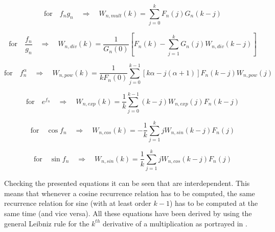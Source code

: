 \begin{equation} \label{eq:recRel2}
\text{for} \quad f_{n}g_{n} \quad \Rightarrow \quad W_{n,mult}\left(k\right)=\displaystyle\sum_{j=0}^{k}F_{n}\left(j\right)G_{n}\left(k-j\right)
\end{equation}

\begin{equation} \label{eq:recRel3}
\text{for} \quad \dfrac{f_{n}}{g_{n}} \quad \Rightarrow \quad W_{n,div}\left(k\right)= \dfrac{1}{G_{n}\left(0\right)}\left[F_{n}\left(k\right)-\displaystyle\sum_{j=1}^{k}G_{n}\left(j\right)W_{n,div}\left(k-j\right) \right]
\end{equation}

\begin{equation} \label{eq:recRel4}
\text{for} \quad f_{n}^{\alpha} \quad \Rightarrow \quad W_{n,pow}\left(k\right)= \dfrac{1}{kF_{n}\left(0\right)} \displaystyle\sum_{j=0}^{k-1}\left[k\alpha-j\left(\alpha+1\right)\right] F_{n}\left(k-j\right)W_{n,pow}\left(j\right) 
\end{equation}

\begin{equation} \label{eq:recRel5}
\text{for} \quad e^{f_{n}} \quad \Rightarrow \quad W_{n,exp}\left(k\right)= \dfrac{1}{k}\displaystyle\sum_{j=0}^{k-1}\left(k-j\right)W_{n,exp}\left(j\right)F_{n}\left(k-j\right)
\end{equation}

\begin{equation} \label{eq:recRel6}
\text{for} \quad \cos f_{n} \quad \Rightarrow \quad W_{n,cos}\left(k\right)= -\dfrac{1}{k}\displaystyle\sum_{j=1}^{k}jW_{n,sin}\left(k-j\right)F_{n}\left(j\right)
\end{equation}

\begin{equation} \label{eq:recRel7}
\text{for} \quad \sin f_{n}  \quad \Rightarrow \quad W_{n,sin}\left(k\right)= \dfrac{1}{k}\displaystyle\sum_{j=1}^{k}jW_{n,cos}\left(k-j\right)F_{n}\left(j\right)
\end{equation}

\noindent
Checking the presented equations it can be seen that  are interdependent. This means that whenever a cosine recurrence relation has to be computed, the same recurrence relation for sine (with at least order $k-1$) has to be computed at the same time (and vice versa). All these equations have been derived by \cite{jorba2005software} using the general Leibniz rule for the $k^{th}$ derivative of a multiplication as portrayed in .


